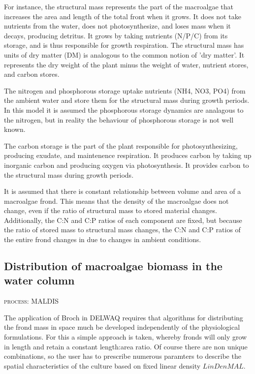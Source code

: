 \documentclass{deltares_manual}
\begin{document}
For instance, the structural mass represents the part of the macroalgae that increases the area and length of the total front when it grows. It does not take nutrients from the water, does not photosynthesize, and loses mass when it decays, producing detritus. It grows by taking nutrients (N/P/C) from its storage, and is thus responsible for growth respiration. The structural mass has units of dry matter (DM) is analogous to the common notion of 'dry matter'. It represents the dry weight of the plant minus the weight of water, nutrient stores, and carbon stores.
 
The nitrogen and phosphorous storage uptake nutrients (NH4, NO3, PO4) from the ambient water and store them for the structural mass during growth periods. In this model it is assumed the phosphorous storage dynamics are analagous to the nitrogen, but in reality the behaviour of phosphorous storage is not well known.

The carbon storage is the part of the plant responsible for photosynthesizing, producing exudate, and maintenence respiration. It produces carbon by taking up inorganic carbon and producing oxygen via photosynthesis. It provides carbon to the structural mass during growth periods. 

It is assumed that there is constant relationship between volume and area of a macroalgae frond. This means that the density of the macroalgae does not change, even if the ratio of structural mass to stored material changes. Additionally, the C:N and C:P ratios of each component are fixed, but because the ratio of stored mass to structural mass changes, the C:N and C:P ratios of the entire frond changes in due to changes in ambient conditions.

\subsection{Distribution of macroalgae biomass in the water column}
\begin{flushright}
	\textsc{process: MALDIS}
\end{flushright}
The application of Broch in DELWAQ requires that algorithms for distributing the frond mass in space much be developed independently of the physiological formulations. For this a simple approach is taken, whereby fronds will only grow in length and retain a constant length:area ratio. Of course there are non unique combinations, so the user has to prescribe numerous paramters to describe the spatial characteristics of the culture
based on fixed linear density $LinDenMAL$.  
\end{document}
